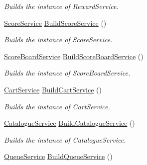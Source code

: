 \begin{DoxyCompactItemize}
\begin{DoxyCompactList}\small\item\em Builds the instance of Reward\+Service. \end{DoxyCompactList}\item 
\hyperlink{classcom_1_1shephertz_1_1app42_1_1paas_1_1sdk_1_1csharp_1_1game_1_1_score_service}{Score\+Service} \hyperlink{classcom_1_1shephertz_1_1app42_1_1paas_1_1sdk_1_1csharp_1_1_service_a_p_i_afb32cca0b10ba7b2dff5e0f0be9362ea}{Build\+Score\+Service} ()
\begin{DoxyCompactList}\small\item\em Builds the instance of Score\+Service. \end{DoxyCompactList}\item 
\hyperlink{classcom_1_1shephertz_1_1app42_1_1paas_1_1sdk_1_1csharp_1_1game_1_1_score_board_service}{Score\+Board\+Service} \hyperlink{classcom_1_1shephertz_1_1app42_1_1paas_1_1sdk_1_1csharp_1_1_service_a_p_i_a1a3c3f63cdb298efb3fa1cdff556b637}{Build\+Score\+Board\+Service} ()
\begin{DoxyCompactList}\small\item\em Builds the instance of Score\+Board\+Service. \end{DoxyCompactList}\item 
\hyperlink{classcom_1_1shephertz_1_1app42_1_1paas_1_1sdk_1_1csharp_1_1shopping_1_1_cart_service}{Cart\+Service} \hyperlink{classcom_1_1shephertz_1_1app42_1_1paas_1_1sdk_1_1csharp_1_1_service_a_p_i_a6c36d2f5c6478af056982ec45f548ff5}{Build\+Cart\+Service} ()
\begin{DoxyCompactList}\small\item\em Builds the instance of Cart\+Service. \end{DoxyCompactList}\item 
\hyperlink{classcom_1_1shephertz_1_1app42_1_1paas_1_1sdk_1_1csharp_1_1shopping_1_1_catalogue_service}{Catalogue\+Service} \hyperlink{classcom_1_1shephertz_1_1app42_1_1paas_1_1sdk_1_1csharp_1_1_service_a_p_i_a34295d133e506128da84fac5620a896c}{Build\+Catalogue\+Service} ()
\begin{DoxyCompactList}\small\item\em Builds the instance of Catalogue\+Service. \end{DoxyCompactList}\item 
\hyperlink{classcom_1_1shephertz_1_1app42_1_1paas_1_1sdk_1_1csharp_1_1message_1_1_queue_service}{Queue\+Service} \hyperlink{classcom_1_1shephertz_1_1app42_1_1paas_1_1sdk_1_1csharp_1_1_service_a_p_i_abab1e7d5d70aaaf4c70f4c63b8cdca4b}{Build\+Queue\+Service} ()

\end{DoxyCompactItemize}
